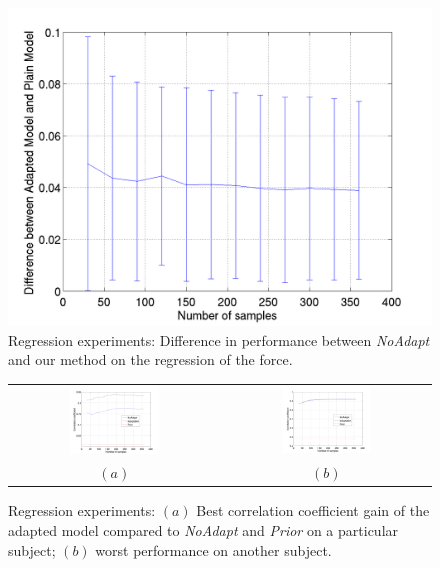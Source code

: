 \begin{figure}[ht]
  \centering
  \includegraphics[width=0.95\linewidth]{figs/exp2}
  \caption{Regression experiments: Difference in performance between \emph{NoAdapt} and our method  on the
 regression of the force.}
  \label{fig:diff_reg}
\end{figure}

\begin{figure}[ht] \centering
  \begin{tabular}{cc}
    \includegraphics[width=0.45\textwidth]{figs/exp2_abs_best} &
    \includegraphics[width=0.45\textwidth]{figs/exp2_abs_worst} \\
    $(a)$ & $(b)$ \\
  \end{tabular}
  \caption{Regression experiments: $(a)$ Best correlation coefficient gain of the adapted model compared to \emph{NoAdapt}
 and \emph{Prior} on a particular subject; $(b)$ worst performance on another subject.}
  \label{fig:reg_abs}
\end{figure}
